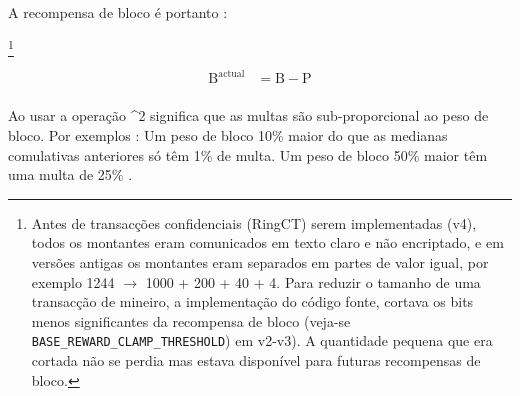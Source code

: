 A recompensa de bloco é portanto :


\footnote{Antes de transacções confidenciais (RingCT) serem implementadas (v4), todos os montantes eram comunicados em texto claro e não encriptado, e em versões antigas os montantes eram separados em partes de valor igual, por exemplo 1244 $\rightarrow$ 1000 + 200 + 40 + 4. Para reduzir o tamanho de uma transacção de mineiro, a implementação do código fonte, cortava os bits menos significantes da recompensa de bloco (veja-se {\tt BASE\_REWARD\_CLAMP\_THRESHOLD}) em v2-v3). A quantidade pequena que era cortada não se perdia mas estava disponível para futuras recompensas de bloco.}        

\begin{align*}
    \textrm{B}^{\textrm{actual}} &= \textrm{B} - \textrm{P} \\
\end{align*}

Ao usar a operação \^{}2 significa que as multas são sub-proporcional ao peso de bloco. Por exemplos :
\newline Um peso de bloco 10\% maior do que as medianas comulativas anteriores só têm 1\% de multa.    
\newline Um peso de bloco 50\% maior têm uma multa de 25\% .

